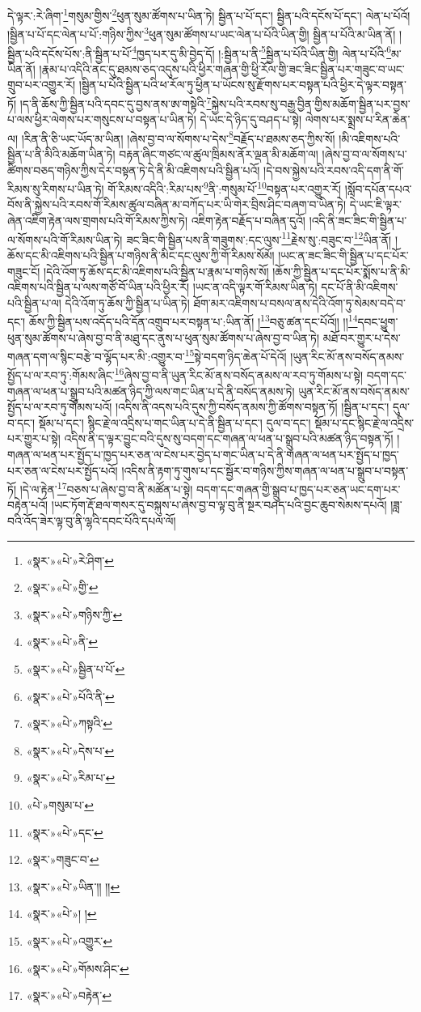 དེ་ལྟར་:རེ་ཞིག་\footnote{«སྣར་»«པེ་»རེ་ཤིག་}གསུམ་གྱིས་\footnote{«སྣར་»«པེ་»གྱི་}ཕུན་སུམ་ཚོགས་པ་ཡིན་ཏེ། སྦྱིན་པ་པོ་དང་། སྦྱིན་པའི་དངོས་པོ་དང་། ལེན་པ་པོའོ། །སྦྱིན་པ་པོ་དང་ལེན་པ་པོ་:གཉིས་ཀྱིས་\footnote{«སྣར་»«པེ་»གཉིས་ཀྱི་}ཕུན་སུམ་ཚོགས་པ་ཡང་ལེན་པ་པོའི་ཡིན་གྱི། སྦྱིན་པ་པོའི་མ་ཡིན་ནོ། །སྦྱིན་པའི་དངོས་པོས་:ནི་སྦྱིན་པ་པོ་\footnote{«སྣར་»«པེ་»ནི་}ཁྱད་པར་དུ་མི་བྱེད་དོ། །:སྦྱིན་པ་ནི་\footnote{«སྣར་»«པེ་»སྦྱིན་པ་པོ་}སྦྱིན་པ་པོའི་ཡིན་གྱི། ལེན་པ་པོའི་\footnote{«སྣར་»«པེ་»པོའི་ནི་}མ་ཡིན་ནོ། །རྣམ་པ་འདིའི་ནང་དུ་ཐམས་ཅད་འདུས་པའི་ཕྱིར་གཞན་གྱི་ཕྱི་རོལ་གྱི་ཟང་ཟིང་སྦྱིན་པར་གཟུང་བ་ཡང་གྲུབ་པར་འགྱུར་རོ། །སྦྱིན་པ་པོའི་སྦྱིན་པའི་ཕ་རོལ་ཏུ་ཕྱིན་པ་ཡོངས་སུ་རྫོགས་པར་བསྟན་པའི་ཕྱིར་དེ་ལྟར་བསྟན་ཏོ། །ད་ནི་ཆོས་ཀྱི་སྦྱིན་པའི་དབང་དུ་བྱས་ནས་ཨ་གསྟེའི་\footnote{«སྣར་»«པེ་»ཀསྟའི་}སྐྱེས་པའི་རབས་སུ་བརྒྱ་བྱིན་གྱིས་མཆོག་སྦྱིན་པར་བྱས་པ་ལས་ཕྱིར་ལེགས་པར་གསུངས་པ་བསྟན་པ་ཡིན་ཏེ། དེ་ཡང་དེ་ཉིད་དུ་བཤད་པ་སྟེ། ལེགས་པར་སྨྲས་པ་རིན་ཆེན་ལ། །རིན་ནི་ཅི་ཡང་ཡོད་མ་ཡིན། །ཞེས་བྱ་བ་ལ་སོགས་པ་དེས་\footnote{«སྣར་»«པེ་»དེས་པ་}བརྗོད་པ་ཐམས་ཅད་ཀྱིས་སོ། །མི་འཇིགས་པའི་སྦྱིན་པ་ནི་མིའི་མཆོག་ཡིན་ཏེ། བརྟན་ཞིང་གཙང་ལ་ཚུལ་ཁྲིམས་ནོར་ལྡན་མི་མཆོག་ལ། །ཞེས་བྱ་བ་ལ་སོགས་པ་ཚིགས་བཅད་གཉིས་ཀྱིས་དེར་བསྟན་ཏེ་དེ་ནི་མི་འཇིགས་པའི་སྦྱིན་པའོ། །དེ་བས་སྐྱེས་པའི་རབས་འདི་དག་ནི་གོ་རིམས་སུ་རིགས་པ་ཡིན་ཏེ། གོ་རིམས་འདིའི་:རིམ་པས་\footnote{«སྣར་»«པེ་»རིམ་པ་}ནི་:གསུམ་པོ་\footnote{«པེ་»གསུམ་པ་}བསྟན་པར་འགྱུར་རོ། །སློབ་དཔོན་དཔའ་བོས་ནི་སྐྱེས་པའི་རབས་གོ་རིམས་ཚུལ་བཞིན་མ་བཀོད་པར་ཡི་གེར་བྲིས་ཤིང་བཞག་བ་ཡིན་ཏེ། དེ་ཡང་ཇི་ལྟར་ཞེན་འཇིག་རྟེན་ལས་གྲགས་པའི་གོ་རིམས་ཀྱིས་ཏེ། འཇིག་རྟེན་བརྗོད་པ་བཞིན་དུའོ། །འདི་ནི་ཟང་ཟིང་གི་སྦྱིན་པ་ལ་སོགས་པའི་གོ་རིམས་ཡིན་ཏེ། ཟང་ཟིང་གི་སྦྱིན་པས་ནི་གཟུགས་:དང་ལུས་\footnote{«སྣར་»«པེ་»དང་}རྗེས་སུ་:བཟུང་བ་\footnote{«སྣར་»གཟུང་བ་}ཡིན་ནོ། །ཆོས་དང་མི་འཇིགས་པའི་སྦྱིན་པ་གཉིས་ནི་མིང་དང་ལུས་ཀྱི་གོ་རིམས་སོམོ། །ཡང་ན་ཟང་ཟིང་གི་སྦྱིན་པ་དང་པོར་གཟུང་ངོ། །དེའི་འོག་ཏུ་ཆོས་དང་མི་འཇིགས་པའི་སྦྱིན་པ་རྣམ་པ་གཉིས་སོ། །ཆོས་ཀྱི་སྦྱིན་པ་དང་པོར་སྨོས་པ་ནི་མི་འཇིགས་པའི་སྦྱིན་པ་ལས་གཙོ་བོ་ཡིན་པའི་ཕྱིར་རོ། །ཡང་ན་འདི་ལྟར་གོ་རིམས་ཡིན་ཏེ། དང་པོ་ནི་མི་འཇིགས་པའི་སྦྱིན་པ་ལ། དེའི་འོག་ཏུ་ཆོས་ཀྱི་སྦྱིན་པ་ཡིན་ཏེ། ཐོག་མར་འཇིགས་པ་བསལ་ནས་དེའི་འོག་ཏུ་སེམས་བདེ་བ་དང་། ཆོས་ཀྱི་སྦྱིན་པས་འདོད་པའི་དོན་འགྲུབ་པར་བསྟན་པ་:ཡིན་ནོ། །\footnote{«སྣར་»«པེ་»ཡིན་།། །།}བཅུ་ཚན་དང་པོའོ།། །།\footnote{«སྣར་»«པེ་»། །}དབང་ཕྱུག་ཕུན་སུམ་ཚོགས་པ་ཞེས་བྱ་བ་ནི་མཐུ་དང་ནུས་པ་ཕུན་སུམ་ཚོགས་པ་ཞེས་བྱ་བ་ཡིན་ཏེ། མཐོ་བར་གྱུར་པ་དེས་གཞན་དག་ལ་སྙིང་བརྩེ་བ་ལྷོད་པར་མི་:འགྱུར་བ་\footnote{«སྣར་»«པེ་»འགྱུར་}སྟེ་བདག་ཉིད་ཆེན་པོ་དེའོ། །ཡུན་རིང་མོ་ནས་བསོད་ནམས་སྤྱོད་པ་ལ་རབ་ཏུ་:གོམས་ཞིང་\footnote{«སྣར་»«པེ་»གོམས་ཤིང་}ཞེས་བྱ་བ་ནི་ཡུན་རིང་མོ་ནས་བསོད་ནམས་ལ་རབ་ཏུ་གོམས་པ་སྟེ། བདག་དང་གཞན་ལ་ཕན་པ་སྒྲུབ་པའི་མཚན་ཉིད་ཀྱི་ལས་གང་ཡིན་པ་དེ་ནི་བསོད་ནམས་ཏེ། ཡུན་རིང་མོ་ནས་བསོད་ནམས་སྤྱོད་པ་ལ་རབ་ཏུ་གོམས་པའོ། །འདིས་ནི་འདས་པའི་དུས་ཀྱི་བསོད་ནམས་ཀྱི་ཚོགས་བསྟན་ཏོ། །སྦྱིན་པ་དང་། དུལ་བ་དང་། སྡོམ་པ་དང་། སྙིང་རྗེ་ལ་འདྲིས་པ་གང་ཡིན་པ་དེ་ནི་སྦྱིན་པ་དང་། དུལ་བ་དང་། སྡོམ་པ་དང་སྙིང་རྗེ་ལ་འདྲིས་པར་གྱུར་པ་སྟེ། འདིས་ནི་ད་ལྟར་བྱུང་བའི་དུས་སུ་བདག་དང་གཞན་ལ་ཕན་པ་སྒྲུབ་པའི་མཚན་ཉིད་བསྟན་ཏོ། །གཞན་ལ་ཕན་པར་སྤྱོད་པ་ཁྱད་པར་ཅན་ལ་ངེས་པར་བྱེད་པ་གང་ཡིན་པ་དེ་ནི་གཞན་ལ་ཕན་པར་སྤྱོད་པ་ཁྱད་པར་ཅན་ལ་ངེས་པར་སྤྱོད་པའོ། །འདིས་ནི་རྟག་ཏུ་གུས་པ་དང་སྦྱོར་བ་གཉིས་ཀྱིས་གཞན་ལ་ཕན་པ་སྒྲུབ་པ་བསྟན་ཏོ། །དེ་ལ་རྟེན་\footnote{«སྣར་»«པེ་»བརྟེན་}བཅས་པ་ཞེས་བྱ་བ་ནི་མཚོན་པ་སྟེ། བདག་དང་གཞན་གྱི་སྒྲུབ་པ་ཁྱད་པར་ཅན་ཡང་དག་པར་བརྟེན་པའོ། །ཡང་ཏོག་རྡོ་ཐལ་གསར་དུ་བསྐུས་པ་ཞེས་བྱ་བ་ལྟ་བུ་ནི་སྔར་བཤད་པའི་བྱང་ཆུབ་སེམས་དཔའོ། །ཟླ་བའི་འོད་ཟེར་ལྟ་བུ་ནི་ལྷའི་དབང་པོའི་དཔལ་ལོ། 